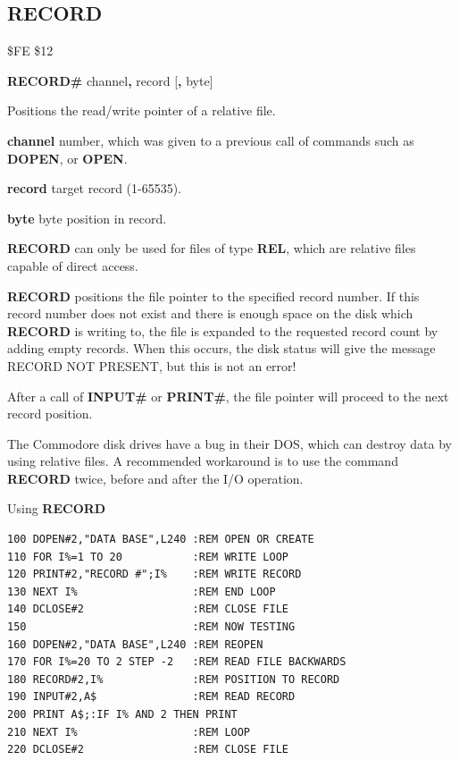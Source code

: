 
\newpage
\subsection{RECORD}
\begin{description}[leftmargin=2cm,style=nextline]
\item [Token:] \$FE \$12
\item [Format:] {\bf RECORD\#} channel{\bf,} record [{\bf,} byte]
\item [Usage:]  Positions the read/write pointer of a relative file.

                {\bf channel} number, which was given to a previous
                call of commands such as {\bf DOPEN}, or {\bf OPEN}.

                {\bf record} target record (1-65535).

                {\bf byte} byte position in record.

                {\bf RECORD} can only be used for files of
                type {\bf REL}, which are relative files capable
                of direct access.

               {\bf RECORD} positions the file pointer
               to the specified record number. If this record number
               does not exist and there is enough space on the disk
               which {\bf RECORD} is writing to,
               the file is expanded to the requested record count by adding
               empty records. When this occurs, the disk
               status will give the message RECORD NOT PRESENT, but
               this is not an error!

               After a call of {\bf INPUT\#} or {\bf PRINT\#}, the file pointer will proceed
               to the next record position.

\item [Remarks:] The Commodore disk drives have a bug
               in their DOS, which can destroy data by using
               relative files. A recommended workaround is to
               use the command {\bf RECORD} twice, before
               and after the I/O operation.

\item [Example:] Using {\bf RECORD}
\begin{tcolorbox}[colback=black,coltext=white]
\verbatimfont{\codefont}
\begin{verbatim}
100 DOPEN#2,"DATA BASE",L240 :REM OPEN OR CREATE
110 FOR I%=1 TO 20           :REM WRITE LOOP
120 PRINT#2,"RECORD #";I%    :REM WRITE RECORD
130 NEXT I%                  :REM END LOOP
140 DCLOSE#2                 :REM CLOSE FILE
150                          :REM NOW TESTING
160 DOPEN#2,"DATA BASE",L240 :REM REOPEN
170 FOR I%=20 TO 2 STEP -2   :REM READ FILE BACKWARDS
180 RECORD#2,I%              :REM POSITION TO RECORD
190 INPUT#2,A$               :REM READ RECORD
200 PRINT A$;:IF I% AND 2 THEN PRINT
210 NEXT I%                  :REM LOOP
220 DCLOSE#2                 :REM CLOSE FILE


\end{verbatim}
\end{tcolorbox}
\end{description}
